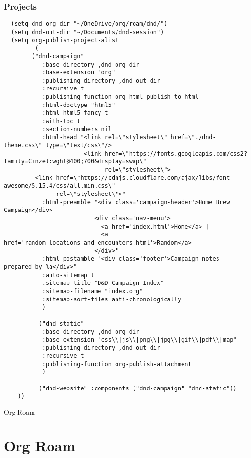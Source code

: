 \documentclass[11pt]{article}
\begin{document}
\subsubsection{Projects}
\label{sec:org2688510}
\begin{verbatim}
  (setq dnd-org-dir "~/OneDrive/org/roam/dnd/")
  (setq dnd-out-dir "~/Documents/dnd-session")
  (setq org-publish-project-alist
        `(
    	("dnd-campaign"
           :base-directory ,dnd-org-dir
           :base-extension "org"
           :publishing-directory ,dnd-out-dir
           :recursive t
           :publishing-function org-html-publish-to-html
           :html-doctype "html5"
           :html-html5-fancy t
           :with-toc t
           :section-numbers nil
           :html-head "<link rel=\"stylesheet\" href=\"./dnd-theme.css\" type=\"text/css\"/>
                       <link href=\"https://fonts.googleapis.com/css2?family=Cinzel:wght@400;700&display=swap\"
                             rel=\"stylesheet\">
         <link href=\"https://cdnjs.cloudflare.com/ajax/libs/font-awesome/5.15.4/css/all.min.css\"
               rel=\"stylesheet\">"
           :html-preamble "<div class='campaign-header'>Home Brew Campaign</div>
                          <div class='nav-menu'>
                            <a href='index.html'>Home</a> |
                            <a href='random_locations_and_encounters.html'>Random</a>
                          </div>"
           :html-postamble "<div class='footer'>Campaign notes prepared by %a</div>"
           :auto-sitemap t
           :sitemap-title "D&D Campaign Index"
           :sitemap-filename "index.org"
           :sitemap-sort-files anti-chronologically
           )

          ("dnd-static"
           :base-directory ,dnd-org-dir
           :base-extension "css\\|js\\|png\\|jpg\\|gif\\|pdf\\|map"
           :publishing-directory ,dnd-out-dir
           :recursive t
           :publishing-function org-publish-attachment
           )

          ("dnd-website" :components ("dnd-campaign" "dnd-static"))
   	))
\end{verbatim}


Org Roam
\section{Org Roam}
\label{sec:org0de2cd2}
\end{document}
